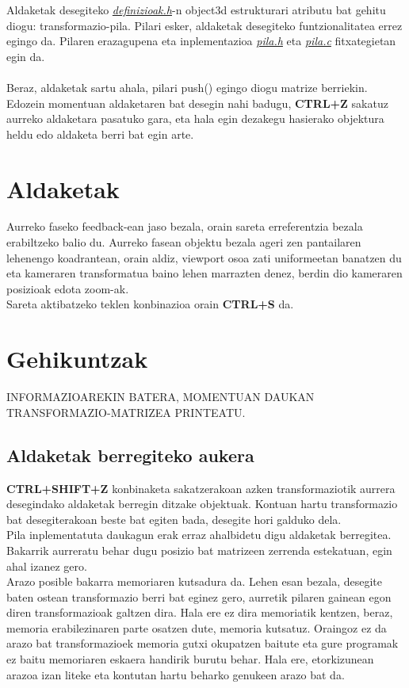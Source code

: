 \documentclass[12pt]{article}
\newcommand{\fitxategi}[1] {\underline{\textit{#1}}}
\newcommand{\tekla}[1] {\textbf{#1}}
\begin{document}
Aldaketak desegiteko \fitxategi{definizioak.h}-n object3d estrukturari atributu bat gehitu diogu: transformazio-pila. Pilari esker, aldaketak desegiteko funtzionalitatea errez egingo da.
Pilaren erazagupena eta inplementazioa \fitxategi{pila.h} eta \fitxategi{pila.c} fitxategietan egin da.\\\\
Beraz, aldaketak sartu ahala, pilari push() egingo diogu matrize berriekin. Edozein momentuan aldaketaren bat desegin nahi badugu, \tekla{CTRL+Z} sakatuz aurreko aldaketara pasatuko gara, eta hala egin dezakegu hasierako objektura heldu edo aldaketa berri bat egin arte.

\section{Aldaketak}

Aurreko faseko feedback-ean jaso bezala, orain sareta erreferentzia bezala erabiltzeko balio du. Aurreko fasean objektu bezala ageri zen pantailaren lehenengo koadrantean, orain aldiz, viewport\cite{viewport} osoa zati uniformeetan banatzen du eta kameraren transformatua baino lehen marrazten denez, berdin dio kameraren posizioak edota zoom-ak.\\
Sareta aktibatzeko teklen konbinazioa orain \tekla{CTRL+S} da.


\section{Gehikuntzak}

INFORMAZIOAREKIN BATERA, MOMENTUAN DAUKAN TRANSFORMAZIO-MATRIZEA PRINTEATU.

\subsection{Aldaketak berregiteko aukera}

\tekla{CTRL+SHIFT+Z} konbinaketa sakatzerakoan azken transformaziotik aurrera desegindako aldaketak berregin ditzake objektuak. Kontuan hartu transformazio bat desegiterakoan beste bat egiten bada, desegite hori galduko dela.\\
Pila inplementatuta daukagun erak erraz ahalbidetu digu aldaketak berregitea. Bakarrik aurreratu behar dugu posizio bat matrizeen zerrenda estekatuan, egin ahal izanez gero.\\

Arazo posible bakarra memoriaren kutsadura da. Lehen esan bezala, desegite baten ostean transformazio berri bat eginez gero, aurretik pilaren gainean egon diren transformazioak galtzen dira. Hala ere ez dira memoriatik kentzen, beraz, memoria erabilezinaren parte osatzen dute, memoria kutsatuz. Oraingoz ez da arazo bat transformazioek memoria gutxi okupatzen baitute eta gure programak ez baitu memoriaren eskaera handirik burutu behar. Hala ere, etorkizunean arazoa izan liteke eta kontutan hartu beharko genukeen arazo bat da.
\end{document}
